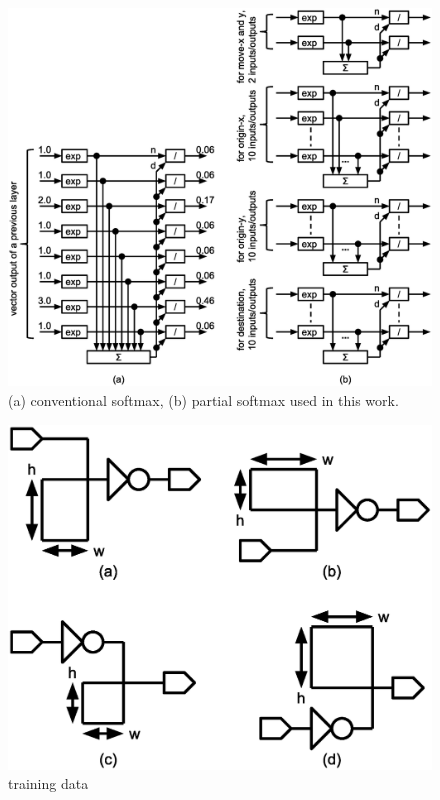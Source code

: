 \documentclass[twocolumn]{article}
\begin{document}
\begin{figure}[tb]
 \begin{center}
  \begin{minipage}{\hsize}
   \includegraphics[width=\hsize]{fig/partial_softmax_03.eps}
   \caption{(a) conventional softmax, (b) partial softmax used in this work.}
   \label{fig:paritial_softmax}
  \end{minipage}
 \end{center}
\end{figure}

\begin{figure}[tb]
 \begin{center}
  \begin{minipage}{\hsize}
   \includegraphics[width=\hsize]{fig/training_data_01.eps}
   \caption{training data}
   \label{fig:training_data}
  \end{minipage}
 \end{center}
\end{figure}
\end{document}

